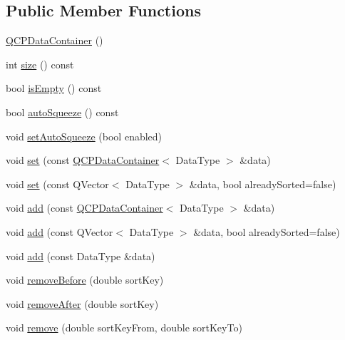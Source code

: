 \subsection*{Public Member Functions}
\begin{DoxyCompactItemize}
\item 
\mbox{\hyperlink{class_q_c_p_data_container_af86c0c63719f92c360ff67cc06c6fe6f}{Q\+C\+P\+Data\+Container}} ()
\item 
int \mbox{\hyperlink{class_q_c_p_data_container_a8e9b262c739672e13472d0d45b720258}{size}} () const
\item 
bool \mbox{\hyperlink{class_q_c_p_data_container_a7bdebfccd2f9f84bf032882f9d6b00a8}{is\+Empty}} () const
\item 
bool \mbox{\hyperlink{class_q_c_p_data_container_a64f0f1621ca46de2352eaf87476db9b1}{auto\+Squeeze}} () const
\item 
void \mbox{\hyperlink{class_q_c_p_data_container_a233f866760a78950d2a393c1a4bc54b5}{set\+Auto\+Squeeze}} (bool enabled)
\item 
void \mbox{\hyperlink{class_q_c_p_data_container_ae7042bd534fc3ce7befa2ce3f790b5bf}{set}} (const \mbox{\hyperlink{class_q_c_p_data_container}{Q\+C\+P\+Data\+Container}}$<$ Data\+Type $>$ \&data)
\item 
void \mbox{\hyperlink{class_q_c_p_data_container_aff99fffbb26597a354c4bc8312596ab2}{set}} (const Q\+Vector$<$ Data\+Type $>$ \&data, bool already\+Sorted=false)
\item 
void \mbox{\hyperlink{class_q_c_p_data_container_a42b98bd994307ccd163a43d576f91ad9}{add}} (const \mbox{\hyperlink{class_q_c_p_data_container}{Q\+C\+P\+Data\+Container}}$<$ Data\+Type $>$ \&data)
\item 
void \mbox{\hyperlink{class_q_c_p_data_container_a51d2a4c9ce4baf5e950b767d26673972}{add}} (const Q\+Vector$<$ Data\+Type $>$ \&data, bool already\+Sorted=false)
\item 
void \mbox{\hyperlink{class_q_c_p_data_container_a715e8e9972466804954a2f8fbd5288b7}{add}} (const Data\+Type \&data)
\item 
void \mbox{\hyperlink{class_q_c_p_data_container_aa7f74cbce304b0369e1626c3798e1eda}{remove\+Before}} (double sort\+Key)
\item 
void \mbox{\hyperlink{class_q_c_p_data_container_abbe5d87ffc10b5aeffa5bb42cf03aa3c}{remove\+After}} (double sort\+Key)
\item 
void \mbox{\hyperlink{class_q_c_p_data_container_ae5f569a120648b167efa78835f12fd38}{remove}} (double sort\+Key\+From, double sort\+Key\+To)

\end{DoxyCompactItemize}
